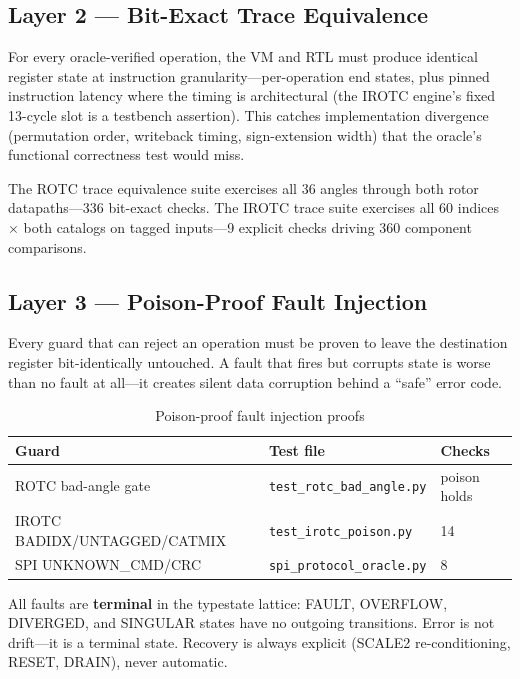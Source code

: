\documentclass[conference]{IEEEtran}
\begin{document}
\subsection{Layer 2 --- Bit-Exact Trace Equivalence}

For every oracle-verified operation, the VM and RTL must produce identical
register state at instruction granularity---per-operation end states, plus
pinned instruction latency where the timing is architectural (the IROTC
engine's fixed 13-cycle slot is a testbench assertion).  This catches
implementation divergence
(permutation order, writeback timing, sign-extension width) that the oracle's
functional correctness test would miss.

The ROTC trace equivalence suite exercises all 36 angles through both rotor
datapaths---336 bit-exact checks.  The IROTC trace suite exercises all 60
indices $\times$ both catalogs on tagged inputs---9 explicit checks driving 360
component comparisons.

\subsection{Layer 3 --- Poison-Proof Fault Injection}

Every guard that can reject an operation must be proven to leave the
destination register bit-identically untouched.  A fault that fires but
corrupts state is worse than no fault at all---it creates silent data
corruption behind a ``safe'' error code.

\begin{table}[h]
\centering
\caption{Poison-proof fault injection proofs}
\label{tab:poison}
\begin{tabular}{p{2.2cm}p{2.4cm}p{1.6cm}}
\toprule
\textbf{Guard} & \textbf{Test file} & \textbf{Checks} \\
\midrule
ROTC bad-angle gate & \texttt{test\_rotc\_bad\_angle.py} & poison holds \\
IROTC BADIDX/UNTAGGED/CATMIX & \texttt{test\_irotc\_poison.py} & 14 \\
SPI UNKNOWN\_CMD/CRC & \texttt{spi\_protocol\_oracle.py} & 8 \\
\bottomrule
\end{tabular}
\end{table}

All faults are \textbf{terminal} in the typestate lattice: FAULT, OVERFLOW,
DIVERGED, and SINGULAR states have no outgoing transitions.  Error is not
drift---it is a terminal state.  Recovery is always explicit (SCALE2
re-conditioning, RESET, DRAIN), never automatic.
\end{document}
